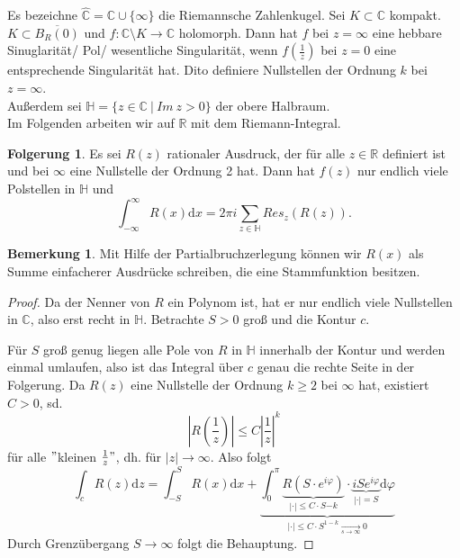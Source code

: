 \documentclass[11pt,titlepage]{article}
\theoremstyle{definition}
\newtheorem{corollary}[theorem]{Folgerung}
\newtheorem{remark}{Bemerkung}
\theoremstyle{remark}
\begin{document}
	Es bezeichne $\hat{\mathbb{C}}=\mathbb{C}\cup \{\infty\}$ die Riemannsche Zahlenkugel. Sei 
	$K\subset\mathbb{C}$ kompakt. $K\subset \overline{B_R(0)}$ und $f:\mathbb{C}\setminus K\to 
	\mathbb{C}$ holomorph. Dann hat $f$ bei $z=\infty$ eine hebbare Sinuglarität/ Pol/ wesentliche 
	Singularität, wenn $f(\frac{1}{z})$ bei $z=0$ eine entsprechende Singularität hat. Dito definiere 
	Nullstellen der Ordnung $k$ bei $z=\infty$.\\
	Außerdem sei $\mathbb{H} =\{ z\in\mathbb{C} \ \vert\ Im\  z>0 \}$ der obere Halbraum. \\
	Im Folgenden arbeiten wir auf $\mathbb{R}$ mit dem Riemann-Integral.
	
	\begin{corollary}
		Es sei $R(z)$ rationaler Ausdruck, der für alle $z\in\mathbb{R}$ definiert ist und bei $\infty$ eine 
		Nullstelle der Ordnung 2 hat. Dann hat $f(z)$ nur endlich viele Polstellen in $\mathbb{H}$ und 
		\[ \int_{-\infty}^{\infty} R(x)\mathrm{d}x =2\pi i \sum_{z\in\mathbb{H}} Res_z(R(z)). \]
	\end{corollary}
	
	\begin{remark}
		Mit Hilfe der Partialbruchzerlegung können wir $R(x)$ als Summe einfacherer Ausdrücke schreiben, 
		die eine Stammfunktion besitzen.
	\end{remark}
	
	\begin{proof}
		Da der Nenner von $R$ ein Polynom ist, hat er nur endlich viele Nullstellen in $\mathbb{C}$, also 
		erst recht in $\mathbb{H}$. Betrachte $S>0$ groß und die Kontur $c$.
		
		
		Für $S$ groß genug liegen alle Pole von $R$ in $\mathbb{H}$ innerhalb der Kontur und werden 
		einmal umlaufen, also ist das Integral über $c$ genau die rechte Seite in der Folgerung. Da $R(z)$ 
		eine Nullstelle der Ordnung $k\geq 2$ bei $\infty$ hat, existiert $C>0$, sd.
		\[ \left|R\left(\frac{1}{z}\right)\right|\leq C\left|\frac{1}{z}\right|^k \]
		für alle $"$kleinen $\frac{1}{z}"$, dh. für $|z|\to \infty$. Also folgt 
		\[ \int_c R(z)\mathrm{d}z=\int_{-S}^S R(x)\mathrm{d}x + \underbrace{\int_0^{\pi} \underbrace{
		R(S\cdot e^{i\varphi})}_{|\cdot|\leq C\cdot S{-k}}\cdot \underbrace{iSe^{i\varphi}}_{|\cdot|=S}\mathrm{d}
		\varphi}_{|\cdot|\leq C\cdot S^{1-k} \underset{s\to\infty}{\to}0} \]
		Durch Grenzübergang $S\to \infty$ folgt die Behauptung.
	\end{proof}
	
\end{document}
